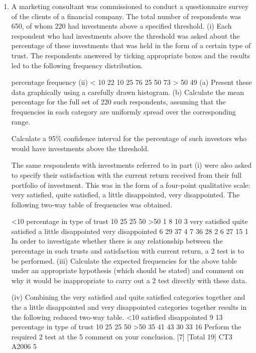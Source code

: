 \documentclass[a4paper,12pt]{article}
\begin{document}
\begin{enumerate}
\item A marketing consultant was commissioned to conduct a questionnaire survey of the clients of a financial company. The total number of respondents was 650, of whom 220 had investments above a specified threshold.
(i)
Each respondent who had investments above the threshold was asked about the percentage of these investments that was held in the form of a certain type of trust. The respondents answered by ticking appropriate boxes and the results led to the following frequency distribution.

percentage
frequency
(ii)
< 10
22
10 25
76
25 50
73
> 50
49
(a) Present these data graphically using a carefully drawn histogram.
(b) Calculate the mean percentage for the full set of 220 such respondents, assuming that the frequencies in each category are uniformly spread over the corresponding range.

Calculate a 95\% confidence interval for the percentage of such investors who would have investments above the threshold.

The same respondents with investments referred to in part (i) were also asked to specify their satisfaction with the current return received from their full portfolio of investment. This was in the form of a four-point qualitative scale: very satisfied, quite satisfied, a little disappointed, very disappointed. The following two-way table of frequencies was obtained.

<10
percentage in type of trust
10 25
25 50
>50
1
8
10
3
very satisfied
quite satisfied
a little disappointed
very disappointed
6
29
37
4
7
36
28
2
6
27
15
1
In order to investigate whether there is any relationship between the percentage in such trusts and satisfaction with current return, a 2 test is to be performed. 
(iii) Calculate the expected frequencies for the above table under an appropriate hypothesis (which should be stated) and comment on why it would be inappropriate to carry out a 2 test directly with these data.

(iv) Combining the very satisfied and quite satisfied categories together and the a little disappointed and very disappointed categories together results in the following reduced two-way table.
<10
satisfied
disappointed
9
13
percentage in type of trust
10 25
25 50
>50
35
41
43
30
33
16
Perform the required 2 test at the 5%
comment on your conclusion.
[7]
[Total 19]
CT3 A2006 5



\end{enumerate}
\end{document}
